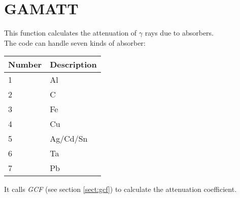 \section{GAMATT}
\label{sect:gamatt}

\noindent This function calculates the attenuation of $\gamma$ rays due to
absorbers.\\

\noindent The code can handle seven kinds of absorber:\\

\begin{tabular}{|ll|}
\hline
Number & Description\\
\hline
1 & Al\\
2 & C\\
3 & Fe\\
4 & Cu\\
5 & Ag/Cd/Sn\\
6 & Ta\\
7 & Pb\\
\hline
\end{tabular}

\noindent It calls {\em GCF} (see section \ref{sect:gcf}) to calculate the
attenuation coefficient.\\

